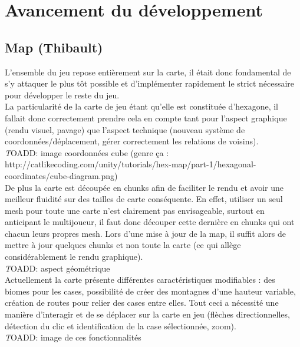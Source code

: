 \documentclass[12pt]{report}
\begin{document}
\chapter{Avancement du développement}

\section{Map (Thibault)}

L’ensemble du jeu repose entièrement sur la carte, il était donc fondamental de s’y attaquer le plus tôt possible et d’implémenter rapidement le strict nécessaire pour développer le reste du jeu.\\
La particularité de la carte de jeu étant qu’elle est constituée d’hexagone, il fallait donc correctement prendre cela en compte tant pour l’aspect graphique (rendu visuel, pavage) que l’aspect technique (nouveau système de coordonnées/déplacement, gérer correctement les relations de voisins).\\

\textit TOADD: image coordonnées cube (genre ça : http://catlikecoding.com/unity/tutorials/hex-map/part-1/hexagonal-coordinates/cube-diagram.png)\\

De plus la carte est découpée en chunks afin de faciliter le rendu et avoir une meilleur fluidité sur des tailles de carte conséquente. En effet, utiliser un seul mesh pour toute une carte n’est clairement pas envisageable, surtout en anticipant le multijoueur, il faut donc découper cette dernière en chunks qui ont chacun leurs propres mesh. Lors d’une mise à jour de la map, il suffit alors de mettre à jour quelques chunks et non toute la carte (ce qui allège considérablement le rendu graphique).\\

\textit TOADD: aspect géométrique\\

Actuellement la carte présente différentes caractéristiques modifiables : des biomes pour les cases, possibilité de créer des montagnes d’une hauteur variable, création de routes pour relier des cases entre elles. Tout ceci a nécessité une manière d’interagir et de se déplacer sur la carte en jeu (flèches directionnelles, détection du clic et identification de la case sélectionnée, zoom).\\

\textit TOADD: image de ces fonctionnalités\\
\end{document}
